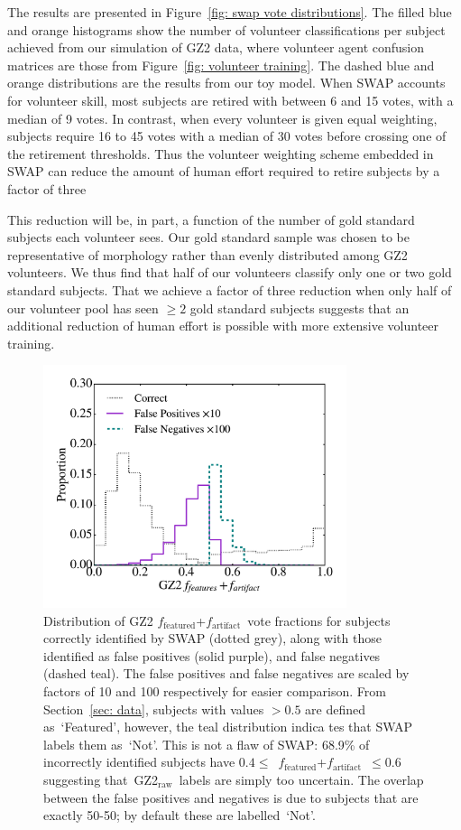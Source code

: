 \documentclass[twocolumn,  trackchanges,]{aastex6}%
\newcommand{\feat}{`Featured'}
\newcommand{\notfeat}{`Not'}
\newcommand{\raw}{GZ2$_{\text{raw}}$}
\newcommand{\ffeat}{$f_{\mathrm{featured}}$}
\newcommand{\fstar}{$f_{\mathrm{artifact}}$}
\begin{document}
The results are presented in Figure~\ref{fig: swap vote distributions}. 
The filled blue and orange histograms show the number of volunteer classifications 
per subject achieved from our simulation of GZ2 data, where volunteer agent confusion
 matrices are those from Figure~\ref{fig: volunteer training}. The dashed blue 
and orange distributions are the results from our toy model. When SWAP accounts 
for volunteer skill, most subjects are retired with between 6 and 15 votes, with 
a median of 9 votes. In contrast, when every volunteer is given equal weighting, 
subjects require 16 to 45 votes with a median of 30 votes before crossing one of 
the retirement thresholds. Thus the volunteer weighting scheme embedded in 
SWAP can reduce the amount of human effort required to retire subjects by a factor of three

This reduction will be, in part, a function of the number of gold standard 
subjects each volunteer sees.  Our gold standard sample was chosen to be 
representative of morphology rather than evenly distributed among GZ2 volunteers. 
We thus find that half of our volunteers classify only one or two gold standard subjects. 
That we achieve a factor of three reduction when only half of our volunteer pool 
has seen $\ge 2$ gold standard subjects suggests that an additional reduction of
  human effort is possible with more extensive volunteer training.

\begin{figure}[t!]
\includegraphics[width=3.5in]{f5.pdf}
\caption{Distribution of GZ2 \ffeat+\fstar~vote fractions for subjects correctly identified by SWAP (dotted grey), along with those identified as false positives (solid purple), and false negatives (dashed teal). 
The false positives and false negatives are scaled by factors of 10 and 100 respectively for easier comparison. From Section~\ref{sec: data}, subjects with values $> 0.5$ are defined as~\feat, however, the teal distribution indica
tes that SWAP labels them as~\notfeat. This is not a flaw of SWAP: 68.9\% of incorrectly identified subjects have $0.4 \le $~\ffeat +\fstar~$ \le 0.6$ suggesting that~\raw~labels are simply too uncertain. The overlap between the false positives and negatives is due to subjects that are exactly 50-50; by default these are labelled~\notfeat. \label{fig: SWAP sucks}}
\end{figure}
\end{document}
